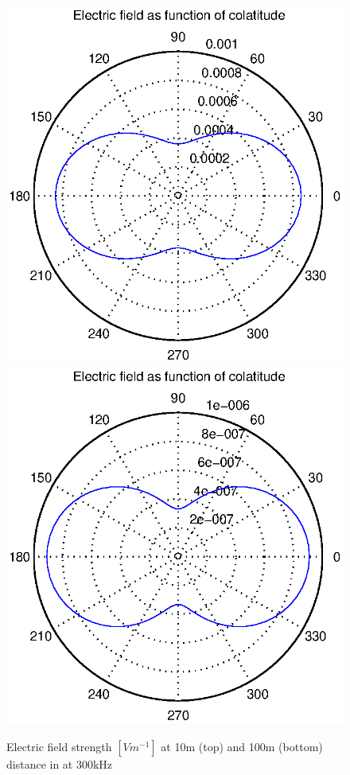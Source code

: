 \documentclass[a4paper,11pt]{thesis}
\begin{document}
\begin{figure}
\begin{center}
  \includegraphics[width=11.5cm]{DissPics/NFvac10m300kHz.eps}
\includegraphics[width=11.5cm]{DissPics/NFvac100m300kHz.eps}
  \caption{Electric field strength $[Vm^{-1}]$ at 10m (top) and 100m (bottom) distance in at 300kHz}\label{figNFvac10m300kHz}
  \end{center}
\end{figure}
\end{document}
